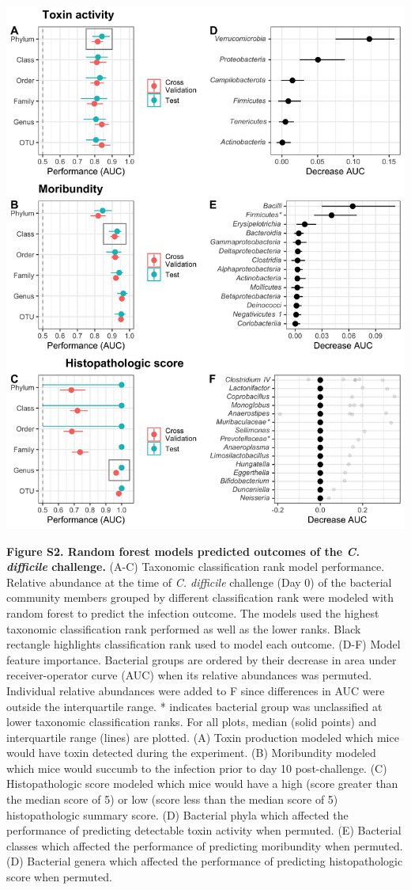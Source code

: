 \documentclass[
  12pt,
]{article}
\begin{document}
\hfill\break

\includegraphics{../results/figures/figure_S2.jpg}

\textbf{Figure S2. Random forest models predicted outcomes of the
\emph{C. difficile} challenge.} (A-C) Taxonomic classification rank
model performance. Relative abundance at the time of \emph{C. difficile}
challenge (Day 0) of the bacterial community members grouped by
different classification rank were modeled with random forest to predict
the infection outcome. The models used the highest taxonomic
classification rank performed as well as the lower ranks. Black
rectangle highlights classification rank used to model each outcome.
(D-F) Model feature importance. Bacterial groups are ordered by their
decrease in area under receiver-operator curve (AUC) when its relative
abundances was permuted. Individual relative abundances were added to F
since differences in AUC were outside the interquartile range. *
indicates bacterial group was unclassified at lower taxonomic
classification ranks. For all plots, median (solid points) and
interquartile range (lines) are plotted. (A) Toxin production modeled
which mice would have toxin detected during the experiment. (B)
Moribundity modeled which mice would succumb to the infection prior to
day 10 post-challenge. (C) Histopathologic score modeled which mice
would have a high (score greater than the median score of 5) or low
(score less than the median score of 5) histopathologic summary score.
(D) Bacterial phyla which affected the performance of predicting
detectable toxin activity when permuted. (E) Bacterial classes which
affected the performance of predicting moribundity when permuted. (D)
Bacterial genera which affected the performance of predicting
histopathologic score when permuted.
\end{document}
